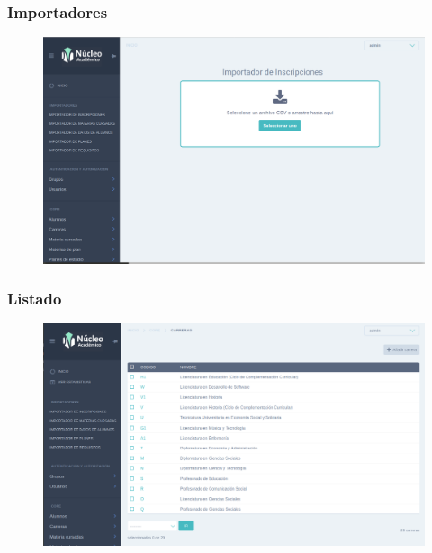 \subsubsection{Importadores}
\begin{figure}[!htbp]
  \centering
    \includegraphics[scale=0.3]{images/nucleo/nucleo-importador.png}
  \label{fig:nucleo-importador}
\end{figure}

\subsubsection{Listado}
\begin{figure}[!htbp]
  \centering
    \includegraphics[scale=0.3]{images/nucleo/nucleo-list.png}
  \label{fig:nucleo-listado}
\end{figure}

